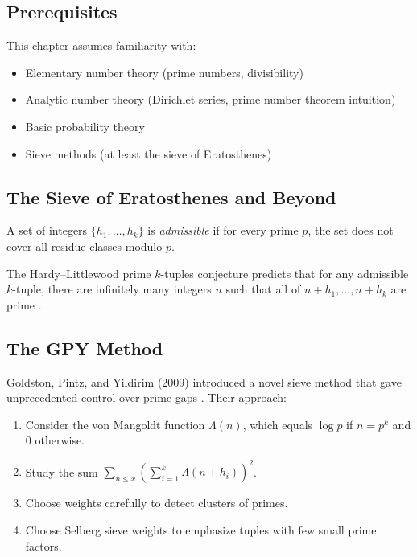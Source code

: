 \subsection{Prerequisites}
This chapter assumes familiarity with:
\begin{itemize}
\item Elementary number theory (prime numbers, divisibility)
\item Analytic number theory (Dirichlet series, prime number theorem intuition)
\item Basic probability theory
\item Sieve methods (at least the sieve of Eratosthenes)
\end{itemize}

\subsection{The Sieve of Eratosthenes and Beyond}

\begin{definition}
A set of integers $\{h_1, \ldots, h_k\}$ is \emph{admissible} if for every prime $p$, the set does not cover all residue classes modulo $p$.
\end{definition}

The Hardy--Littlewood prime $k$-tuples conjecture predicts that for any admissible $k$-tuple, there are infinitely many integers $n$ such that all of $n+h_1, \ldots, n+h_k$ are prime \cite{hardy1923}.

\subsection{The GPY Method}

Goldston, Pintz, and Yildirim (2009) introduced a novel sieve method that gave unprecedented control over prime gaps \cite{gpy2009}. Their approach:

\begin{enumerate}
\item Consider the von Mangoldt function $\Lambda(n)$, which equals $\log p$ if $n = p^k$ and 0 otherwise.
\item Study the sum $\sum_{n \leq x} \left(\sum_{i=1}^k \Lambda(n+h_i)\right)^2$.
\item Choose weights carefully to detect clusters of primes.
\item Choose Selberg sieve weights to emphasize tuples with few small prime factors.
\end{enumerate}

